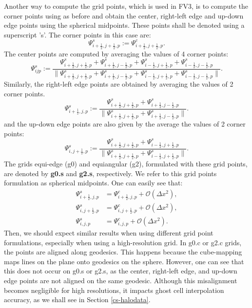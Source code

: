 Another way to compute the grid points, which is used in FV3, is to compute the corner
points using as before and obtain the center, right-left edge and up-down edge points using the spherical midpoints.
These points shall be denoted using a superscript 's'.
The corner points in this case are:
\begin{equation}
	\Psi_{i+\frac{1}{2},j+\frac{1}{2},p}^s := \Psi_{i+\frac{1}{2},j+\frac{1}{2},p}^c.
\end{equation}
The center points are computed by averaging the values of 4 corner points:
\begin{equation}
	\Psi_{ijp}^s :=
	\frac{\Psi_{i+\frac{1}{2},j+\frac{1}{2},p}^s + \Psi_{i+\frac{1}{2},j-\frac{1}{2},p}^s + \Psi_{i-\frac{1}{2},j+\frac{1}{2},p}^s + \Psi_{i-\frac{1}{2},j-\frac{1}{2},p}^s}
         {\|\Psi_{i+\frac{1}{2},j+\frac{1}{2},p}^s + \Psi_{i+\frac{1}{2},j-\frac{1}{2},p}^s + \Psi_{i-\frac{1}{2},j+\frac{1}{2},p}^s + \Psi_{i-\frac{1}{2},j-\frac{1}{2},p}^s\|}.
\end{equation}
Similarly, the right-left edge points are obtained by averaging the values of 2 corner points.
\begin{equation}
	\Psi_{i+\frac{1}{2},j,p}^s :=
	\frac{\Psi_{i+\frac{1}{2},j+\frac{1}{2},p}^s + \Psi_{i+\frac{1}{2},j-\frac{1}{2},p}^s}
	   {\|\Psi_{i+\frac{1}{2},j+\frac{1}{2},p}^s + \Psi_{i+\frac{1}{2},j-\frac{1}{2},p}^s\|}.
\end{equation}
and the up-down edge points are also  given by the average  the values of 2 corner points:
\begin{equation}
	\Psi_{i,j+\frac{1}{2},p}^s :=
	\frac{\Psi_{i+\frac{1}{2},j+\frac{1}{2},p}^s + \Psi_{i-\frac{1}{2},j+\frac{1}{2},p}^s}
	     {\|\Psi_{i+\frac{1}{2},j+\frac{1}{2},p}^s + \Psi_{i-\frac{1}{2},j+\frac{1}{2},p}^s\|}.
\end{equation}
The grids equi-edge (g0) and equiangular (g2), formulated with these grid points, are denoted by \textbf{g0.s} and \textbf{g2.s}, respectively.
We refer to this grid points formulation as spherical midpoints.
One can easily see that:
\begin{align}
	\Psi_{i+\frac{1}{2},j,p}^s &= \Psi_{i+\frac{1}{2},j,p}^c+ \mathcal{O}(\Delta x^2),\\
	\Psi_{i,j+\frac{1}{2},p}^s &= \Psi_{i,j+\frac{1}{2},p}^c+ \mathcal{O}(\Delta x^2),\\
	\Psi_{i,j,p}^s &= \Psi_{i,j,p}^c + \mathcal{O}(\Delta x^2).
\end{align}
Then, we should expect similar results when using different grid point formulations, especially when using a high-resolution grid.
In g0.c or g2.c grids, the points are aligned along geodesics.
This happens because the cube-mapping maps lines on the plane onto geodesics on the sphere.
However, one can see that this does not occur on g0.s or g2.s, as the center, right-left edge, and up-down edge points are not aligned on the same geodesic.
Although this misalignment becomes negligible for high resolutions,
it impacts ghost cell interpolation accuracy, as we shall see in Section \ref{cs-halodata}.

